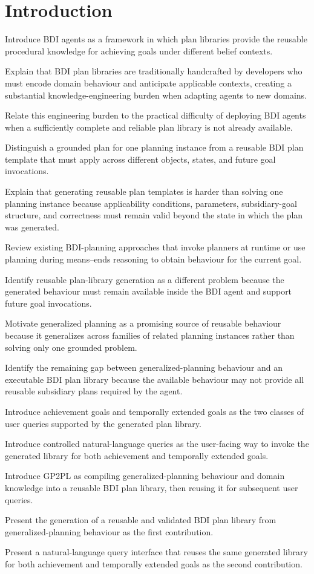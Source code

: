 \section{Introduction}

Introduce BDI agents as a framework in which plan libraries provide the reusable procedural knowledge for achieving goals under different belief contexts.

Explain that BDI plan libraries are traditionally handcrafted by developers who must encode domain behaviour and anticipate applicable contexts, creating a substantial knowledge-engineering burden when adapting agents to new domains.

Relate this engineering burden to the practical difficulty of deploying BDI agents when a sufficiently complete and reliable plan library is not already available.

Distinguish a grounded plan for one planning instance from a reusable BDI plan template that must apply across different objects, states, and future goal invocations.

Explain that generating reusable plan templates is harder than solving one planning instance because applicability conditions, parameters, subsidiary-goal structure, and correctness must remain valid beyond the state in which the plan was generated.

Review existing BDI-planning approaches that invoke planners at runtime or use planning during means--ends reasoning to obtain behaviour for the current goal.

Identify reusable plan-library generation as a different problem because the generated behaviour must remain available inside the BDI agent and support future goal invocations.

Motivate generalized planning as a promising source of reusable behaviour because it generalizes across families of related planning instances rather than solving only one grounded problem.

Identify the remaining gap between generalized-planning behaviour and an executable BDI plan library because the available behaviour may not provide all reusable subsidiary plans required by the agent.

Introduce achievement goals and temporally extended goals as the two classes of user queries supported by the generated plan library.

Introduce controlled natural-language queries as the user-facing way to invoke the generated library for both achievement and temporally extended goals.

Introduce GP2PL as compiling generalized-planning behaviour and domain knowledge
into a reusable BDI plan library, then reusing it for subsequent user queries.

Present the generation of a reusable and validated BDI plan library from generalized-planning behaviour as the first contribution.

Present a natural-language query interface that reuses the same generated library for both achievement and temporally extended goals as the second contribution.
